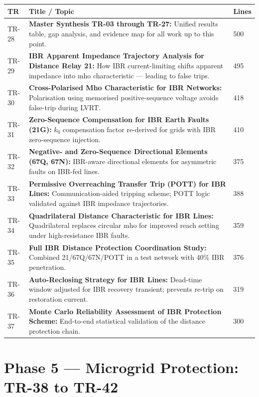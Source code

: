 \documentclass[11pt,a4paper]{article}
\begin{document}
\begin{longtable}{lp{9.5cm}l}
\toprule
\textbf{TR} & \textbf{Title / Topic} & \textbf{Lines} \\
\midrule
\endhead
TR-28 & \textbf{Master Synthesis TR-03 through TR-27:} Unified results table, gap analysis, and evidence map for all work up to this point. & 500 \\[3pt]
TR-29 & \textbf{IBR Apparent Impedance Trajectory Analysis for Distance Relay 21:} How IBR current-limiting shifts apparent impedance into mho characteristic — leading to false trips. & 495 \\[3pt]
TR-30 & \textbf{Cross-Polarised Mho Characteristic for IBR Networks:} Polarisation using memorised positive-sequence voltage avoids false-trip during LVRT. & 418 \\[3pt]
TR-31 & \textbf{Zero-Sequence Compensation for IBR Earth Faults (21G):} $k_0$ compensation factor re-derived for grids with IBR zero-sequence injection. & 410 \\[3pt]
TR-32 & \textbf{Negative- and Zero-Sequence Directional Elements (67Q, 67N):} IBR-aware directional elements for asymmetric faults on IBR-fed lines. & 375 \\[3pt]
TR-33 & \textbf{Permissive Overreaching Transfer Trip (POTT) for IBR Lines:} Communication-aided tripping scheme; POTT logic validated against IBR impedance trajectories. & 388 \\[3pt]
TR-34 & \textbf{Quadrilateral Distance Characteristic for IBR Lines:} Quadrilateral replaces circular mho for improved reach setting under high-resistance IBR faults. & 359 \\[3pt]
TR-35 & \textbf{Full IBR Distance Protection Coordination Study:} Combined 21/67Q/67N/POTT in a test network with 40\% IBR penetration. & 376 \\[3pt]
TR-36 & \textbf{Auto-Reclosing Strategy for IBR Lines:} Dead-time window adjusted for IBR recovery transient; prevents re-trip on restoration current. & 319 \\[3pt]
TR-37 & \textbf{Monte Carlo Reliability Assessment of IBR Protection Scheme:} End-to-end statistical validation of the distance protection chain. & 300 \\[3pt]
\bottomrule
\end{longtable}

\section{Phase 5 — Microgrid Protection: TR-38 to TR-42}
\end{document}
